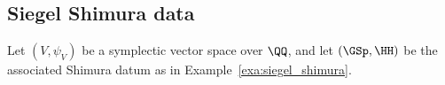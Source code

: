 %
%
%
%
%
%
%
%
%
%
%

\subsection{Siegel Shimura data}\label{sec:siegel_equivariance}
Let $(V,\psi_V)$ be a symplectic vector space over $\QQ$, and let $(\GSp,\HH)$ be the associated Shimura datum as in Example~\ref{exa:siegel_shimura}.

